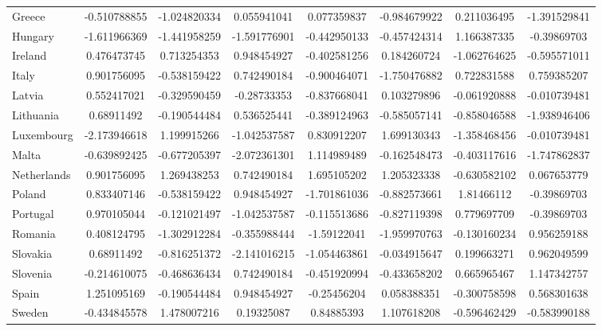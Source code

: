 \documentclass[a4paper, twoside]{report}
\begin{document}
\begin{table}[htbp]
\begin{adjustbox}{max width=\linewidth}
\begin{tabular}{lccccccc}
    Greece & -0.510788855 & -1.024820334 & 0.055941041 & 0.077359837 & -0.984679922 & 0.211036495 & -1.391529841 \\
    Hungary & -1.611966369 & -1.441958259 & -1.591776901 & -0.442950133 & -0.457424314 & 1.166387335 & -0.39869703 \\
    Ireland & 0.476473745 & 0.713254353 & 0.948454927 & -0.402581256 & 0.184260724 & -1.062764625 & -0.595571011 \\
    Italy & 0.901756095 & -0.538159422 & 0.742490184 & -0.900464071 & -1.750476882 & 0.722831588 & 0.759385207 \\
    Latvia & 0.552417021 & -0.329590459 & -0.28733353 & -0.837668041 & 0.103279896 & -0.061920888 & -0.010739481 \\
    Lithuania & 0.68911492 & -0.190544484 & 0.536525441 & -0.389124963 & -0.585057141 & -0.858046588 & -1.938946406 \\
    Luxembourg & -2.173946618 & 1.199915266 & -1.042537587 & 0.830912207 & 1.699130343 & -1.358468456 & -0.010739481 \\
    Malta & -0.639892425 & -0.677205397 & -2.072361301 & 1.114989489 & -0.162548473 & -0.403117616 & -1.747862837 \\
    Netherlands & 0.901756095 & 1.269438253 & 0.742490184 & 1.695105202 & 1.205323338 & -0.630582102 & 0.067653779 \\
    Poland & 0.833407146 & -0.538159422 & 0.948454927 & -1.701861036 & -0.882573661 & 1.81466112 & -0.39869703 \\
    Portugal & 0.970105044 & -0.121021497 & -1.042537587 & -0.115513686 & -0.827119398 & 0.779697709 & -0.39869703 \\
    Romania & 0.408124795 & -1.302912284 & -0.355988444 & -1.59122041 & -1.959970763 & -0.130160234 & 0.956259188 \\
    Slovakia & 0.68911492 & -0.816251372 & -2.141016215 & -1.054463861 & -0.034915647 & 0.199663271 & 0.962049599 \\
    Slovenia & -0.214610075 & -0.468636434 & 0.742490184 & -0.451920994 & -0.433658202 & 0.665965467 & 1.147342757 \\
    Spain & 1.251095169 & -0.190544484 & 0.948454927 & -0.25456204 & 0.058388351 & -0.300758598 & 0.568301638 \\
    Sweden & -0.434845578 & 1.478007216 & 0.19325087 & 0.84885393 & 1.107618208 & -0.596462429 & -0.583990188 \\
    \bottomrule
    \end{tabular}%
    \end{adjustbox}
  \label{tab:z_score}%
\end{table}%
\end{document}

